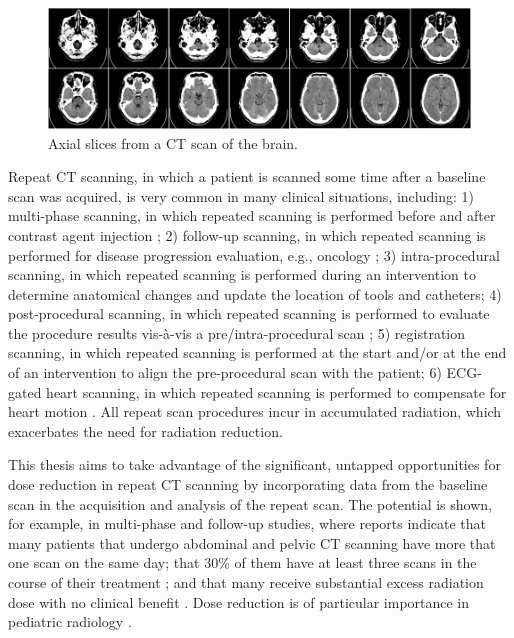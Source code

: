 \begin{figure}[t]
    \centering
    \includegraphics[width=15cm]{figures/Brain_CT.png}
    \caption{\small{Axial slices from a CT scan of the brain.}}
    \label{fig:figures/Brain_CT.png}
\end{figure}

Repeat CT scanning, in which a patient is scanned some time after a baseline scan was acquired, is very common in many clinical situations, including: 1) multi-phase scanning, in which repeated scanning is performed before and after contrast agent injection \cite{kondo2007mdct}; 2) follow-up scanning, in which repeated scanning is performed for disease progression evaluation, e.g., oncology \cite{zhao2009evaluating}; 3) intra-procedural scanning, in which repeated scanning is performed during an intervention to determine anatomical changes and update the location of tools and catheters; 4) post-procedural scanning, in which repeated scanning is performed to evaluate the procedure results vis-à-vis a pre/intra-procedural scan \cite{thomas2010scheduled, hansen2006repeat}; 5) registration scanning, in which repeated scanning is performed at the start and/or at the end of an intervention to align the pre-procedural scan with the patient; 6) ECG-gated heart scanning, in which repeated scanning is performed to compensate for heart motion \cite{desjardins2004ecg, dafni2013methods}. All repeat scan procedures incur in accumulated radiation, which exacerbates the need for radiation reduction.

This thesis aims to take advantage of the significant, untapped opportunities for dose reduction in repeat CT scanning by incorporating data from the baseline scan in the acquisition and analysis of the repeat scan. The potential is shown, for example, in multi-phase and follow-up studies, where reports indicate that many patients that undergo abdominal and pelvic CT scanning have more that one scan on the same day; that 30\% of them have at least three scans in the course of their treatment \cite{davies2011risks}; and that many receive substantial excess radiation dose with no clinical benefit \cite{mettler2000ct}. Dose reduction is of particular importance in pediatric radiology \cite{donnelly2005reducing, chodick2007excess}.

